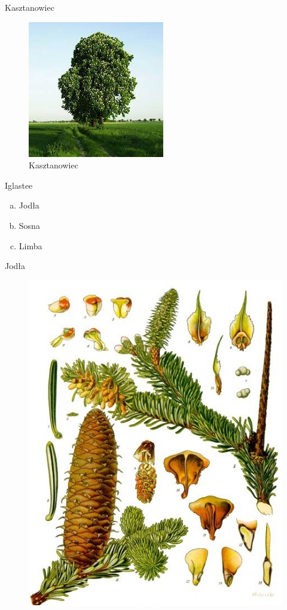 \documentclass{beamer}
\begin{document}
\begin{frame}{Kasztanowiec}
\begin{figure}[h!]
\includegraphics[scale=0.7]{kasz.jpg}
\caption{Kasztanowiec}
\label{kas}
\end{figure}
\end{frame}

\begin{frame}{Iglastee}
\begin{enumerate}[a)]
\item Jodła
\pause
\item Sosna
\pause
\item Limba
\end{enumerate}
\end{frame}

\begin{frame}{Jodła}
\begin{figure}[h!]
\includegraphics[scale=0.3]{jod.jpg}
\end{figure}
\end{frame}
\end{document}
